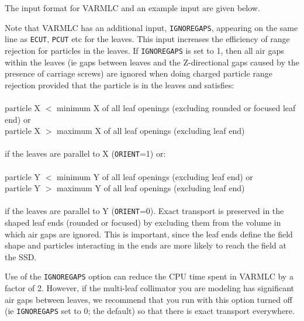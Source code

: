 \documentclass[12pt,twoside]{article}
\begin{document}
\clearpage

The input format for VARMLC and an example input are given below.
\begin{small}

\end{small}

Note that VARMLC has an additional input, {\tt IGNOREGAPS}, appearing on
the same line as {\tt ECUT}, {\tt PCUT} etc for the leaves.  This input
increases the efficiency of range rejection for particles in the
leaves.  If {\tt IGNOREGAPS} is set to 1, then all air gaps within the leaves
(ie gaps between leaves and the Z-directional gaps caused by the presence
of carriage screws) are ignored when doing charged particle range rejection
provided that the particle is in the leaves and satisfies:\\
~~~\\
particle X $<$ minimum X of all leaf openings (excluding rounded or focused leaf end) or\\
particle X $>$ maximum X of all leaf openings (excluding leaf end)\\
~~\\
if the leaves are parallel to X ({\tt ORIENT}=1) or:\\
~~~\\
particle Y $<$ minimum Y of all leaf openings (excluding leaf end) or\\
particle Y $>$ maximum Y of all leaf openings (excluding leaf end)\\
~~\\
if the leaves are parallel to Y ({\tt ORIENT}=0).  Exact transport is
preserved in the shaped leaf ends (rounded or focused) by excluding them
from the volume in which air gaps are ignored.  This is important, since
the leaf ends define the field shape and particles interacting in the ends are
more likely to reach the field at the SSD.

Use of the {\tt IGNOREGAPS} option can reduce the CPU time spent in
VARMLC by a factor of 2.  However, if the multi-leaf collimator you
are modeling has significant air gaps between leaves, we recommend
that you run with this option turned off
(ie {\tt IGNOREGAPS} set to 0; the default) so that there is exact
transport everywhere.


\clearpage

\end{document}
